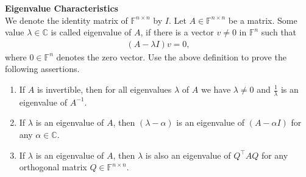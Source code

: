 \textbf{Eigenvalue Characteristics}\\
We denote the identity matrix of $\mathbb{F}^{n \times n}$ by $I$. Let $A \in \mathbb{F}^{n\times n}$ be a matrix. Some value $\lambda \in \mathbb{C}$ 
is called eigenvalue of $A$, if there is a vector $v \neq {0}$ in $\mathbb{F}^{n}$ such that
\begin{align*}
(A - \lambda I)v = {0},
\end{align*}  
where ${0} \in \mathbb{F}^{n}$ denotes the zero vector. Use the above definition to prove the following assertions.
\begin{enumerate}
	\item If $A$ is invertible, then for all eigenvalues $\lambda$ of $A$ we have $\lambda \neq 0$ and $\frac{1}{\lambda}$ is an eigenvalue of $A^{-1}$.
	\item If $\lambda$ is an eigenvalue of $A$, then $(\lambda - \alpha)$ is an eigenvalue of $(A - \alpha I)$ for any $\alpha \in \mathbb{C}$.
	\item If $\lambda$ is an eigenvalue of $A$, then $\lambda$ is also an eigenvalue of $Q^\top A Q$ for any orthogonal matrix $Q \in \mathbb{F}^{n \times n}$.
\end{enumerate}
